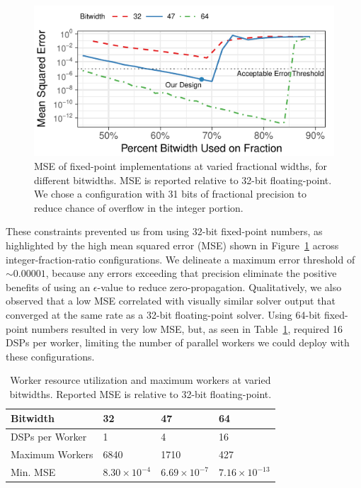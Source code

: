 \begin{figure}[h!]
  \centering
  \includegraphics[width=.7\columnwidth]{hfbs-figs/fixed_point.pdf}
  \caption{MSE of fixed-point implementations at varied fractional widths, for different bitwidths. MSE is reported relative to 32-bit floating-point. We chose a configuration with 31 bits of fractional precision to reduce chance of overflow in the integer portion.}
  \label{fig:fixed-point}
\end{figure}

These constraints prevented us from using 32-bit fixed-point numbers, as highlighted by the high mean squared error (MSE) shown in Figure~\ref{fig:fixed-point} across integer-fraction-ratio configurations.
We delineate a maximum error threshold of $\sim 0.00001$, because any errors exceeding that precision eliminate the positive benefits of using an $\epsilon$-value to reduce zero-propagation.
Qualitatively, we also observed that a low MSE correlated with visually similar solver output that converged at the same rate as a 32-bit floating-point solver.
Using 64-bit fixed-point numbers resulted in very low MSE, but, as seen in Table~\ref{table:dsp-workers}, required 16 DSPs per worker, limiting the number of parallel workers we could deploy with these configurations.


\begin{table}[h!]
  \centering
  \caption{Worker resource utilization and maximum workers at varied bitwidths. Reported MSE is relative to 32-bit floating-point.}

  \begin{tabular}{l|lll}
  \toprule
  Bitwidth        & 32                   & 47                    & 64                   \\ \midrule
  DSPs per Worker & 1                    & 4                     & 16                   \\
  Maximum Workers & 6840                  & 1710                    & 427                   \\
  Min. MSE        & $8.30\times 10^{-4}$ &  $6.69\times 10^{-7}$  & $7.16\times 10^{-13}$ \\ \bottomrule
  \end{tabular}
  \label{table:dsp-workers}


\end{table}


